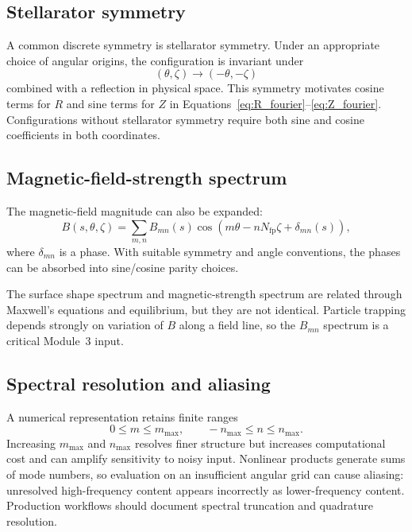 \subsection{Stellarator symmetry}
A common discrete symmetry is stellarator symmetry. Under an appropriate choice of angular origins, the configuration is invariant under
\begin{equation}
(\theta,\zeta)\rightarrow(-\theta,-\zeta)
\end{equation}
combined with a reflection in physical space. This symmetry motivates cosine terms for $R$ and sine terms for $Z$ in Equations~\eqref{eq:R_fourier}--\eqref{eq:Z_fourier}. Configurations without stellarator symmetry require both sine and cosine coefficients in both coordinates.

\subsection{Magnetic-field-strength spectrum}
The magnetic-field magnitude can also be expanded:
\begin{equation}
B(s,\theta,\zeta)
=\sum_{m,n}B_{mn}(s)
\cos\left(m\theta-nN_{\mathrm{fp}}\zeta+\delta_{mn}(s)\right),
\label{eq:B_spectrum_general}
\end{equation}
where $\delta_{mn}$ is a phase. With suitable symmetry and angle conventions, the phases can be absorbed into sine/cosine parity choices.

The surface shape spectrum and magnetic-strength spectrum are related through Maxwell's equations and equilibrium, but they are not identical. Particle trapping depends strongly on variation of $B$ along a field line, so the $B_{mn}$ spectrum is a critical Module~3 input.

\subsection{Spectral resolution and aliasing}
A numerical representation retains finite ranges
\begin{equation}
0\leq m\leq m_{\max},
\qquad
-n_{\max}\leq n\leq n_{\max}.
\end{equation}
Increasing $m_{\max}$ and $n_{\max}$ resolves finer structure but increases computational cost and can amplify sensitivity to noisy input. Nonlinear products generate sums of mode numbers, so evaluation on an insufficient angular grid can cause aliasing: unresolved high-frequency content appears incorrectly as lower-frequency content. Production workflows should document spectral truncation and quadrature resolution.

